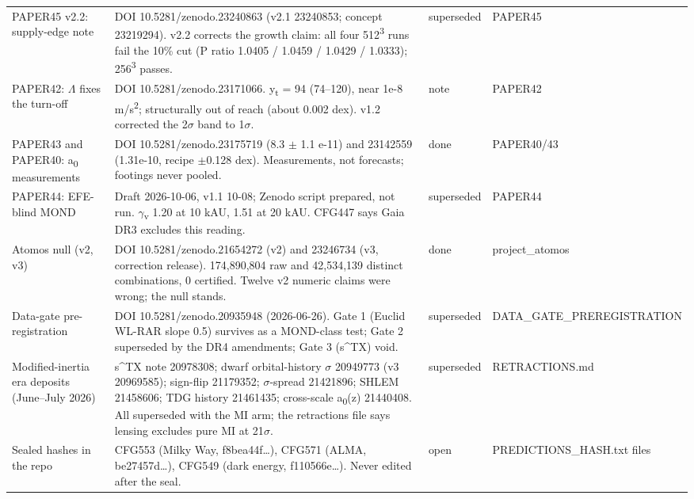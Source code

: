 \documentclass[10pt]{article}
\begin{document}
{\begin{longtable}{>{\raggedright\arraybackslash}p{5.2cm}>{\raggedright\arraybackslash}p{13.0cm}>{\raggedright\arraybackslash}p{1.8cm}>{\raggedright\arraybackslash}p{2.4cm}}
PAPER45 v2.2: supply-edge note & DOI 10.5281/zenodo.23240863 (v2.1 23240853; concept 23219294). v2.2 corrects the growth claim: all four 512\textsuperscript{3} runs fail the 10\% cut (P ratio 1.0405 / 1.0459 / 1.0429 / 1.0333); 256\textsuperscript{3} passes. & superseded & PAPER45 \\

PAPER42: \ensuremath{\Lambda} fixes the turn-off & DOI 10.5281/zenodo.23171066. y\textsubscript{t} = 94 (74--120), near 1e-8 m/s\textsuperscript{2}; structurally out of reach (about 0.002 dex). v1.2 corrected the 2\ensuremath{\sigma} band to 1\ensuremath{\sigma}. & note & PAPER42 \\

PAPER43 and PAPER40: a\textsubscript{0} measurements & DOI 10.5281/zenodo.23175719 (8.3 \ensuremath{\pm} 1.1 e-11) and 23142559 (1.31e-10, recipe \ensuremath{\pm}0.128 dex). Measurements, not forecasts; footings never pooled. & done & PAPER40/43 \\

PAPER44: EFE-blind MOND & Draft 2026-10-06, v1.1 10-08; Zenodo script prepared, not run. \ensuremath{\gamma}\textsubscript{v} 1.20 at 10 kAU, 1.51 at 20 kAU. CFG447 says Gaia DR3 excludes this reading. & superseded & PAPER44 \\

Atomos null (v2, v3) & DOI 10.5281/zenodo.21654272 (v2) and 23246734 (v3, correction release). 174,890,804 raw and 42,534,139 distinct combinations, 0 certified. Twelve v2 numeric claims were wrong; the null stands. & done & project\_atomos \\

Data-gate pre-registration & DOI 10.5281/zenodo.20935948 (2026-06-26). Gate 1 (Euclid WL-RAR slope 0.5) survives as a MOND-class test; Gate 2 superseded by the DR4 amendments; Gate 3 (s\^{}TX) void. & superseded & DATA\_GATE\_PREREGISTRATION \\

Modified-inertia era deposits (June--July 2026) & s\^{}TX note 20978308; dwarf orbital-history \ensuremath{\sigma} 20949773 (v3 20969585); sign-flip 21179352; \ensuremath{\sigma}-spread 21421896; SHLEM 21458606; TDG history 21461435; cross-scale a\textsubscript{0}(z) 21440408. All superseded with the MI arm; the retractions file says lensing excludes pure MI at 21\ensuremath{\sigma}. & superseded & RETRACTIONS.md \\

Sealed hashes in the repo & CFG553 (Milky Way, f8bea44f\ldots{}), CFG571 (ALMA, be27457d\ldots{}), CFG549 (dark energy, f110566e\ldots{}). Never edited after the seal. & open & PREDICTIONS\_HASH.txt files \\

\bottomrule\end{longtable}}
\end{document}
